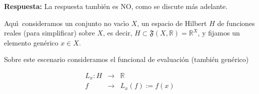 \documentclass[12pt,reqno]{amsart}
\begin{document}
\textbf{Respuesta:}
La respuesta tambi\'en es NO, como se discute m\'as adelante.


Aqu\'\i\ consideramos un conjunto no vac\'\i o $X$, un espacio de
Hilbert $H$ de funciones reales (para simplificar) sobre $X$,
es decir, $H\subset\mathfrak{F}(X,\mathbb{R})=\mathbb{R}^X$,
y fijamos un elemento gen\'erico $x\in X$.

\smallskip
Sobre este escenario consideramos el funcional de evaluaci\'on
(tambi\'en gen\'erico)

\begin{eqnarray*}
L_x: H &\rightarrow &\mathbb{R} \\
 f &\rightarrow & L_x(f):= f(x)
\end{eqnarray*}
\end{document}
